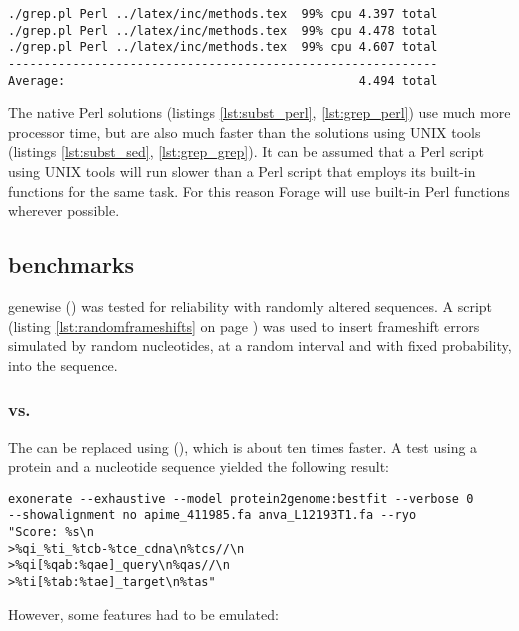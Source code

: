 \begin{verbatim}
./grep.pl Perl ../latex/inc/methods.tex  99% cpu 4.397 total
./grep.pl Perl ../latex/inc/methods.tex  99% cpu 4.478 total
./grep.pl Perl ../latex/inc/methods.tex  99% cpu 4.607 total
------------------------------------------------------------
Average:                                         4.494 total
\end{verbatim}

The native Perl solutions (listings \ref{lst:subst_perl}, \ref{lst:grep_perl}) use much more processor time, but are also much faster than the solutions using UNIX tools (listings \ref{lst:subst_sed}, \ref{lst:grep_grep}). It can be assumed that a Perl script using UNIX tools will run slower than a Perl script that employs its built-in functions for the same task. For this reason Forage will use built-in Perl functions wherever possible.

\subsection{ benchmarks}
genewise (\cite{Birney2004}) was tested for reliability with randomly altered sequences. A script (listing \ref{lst:randomframeshifts} on page \pageref{lst:randomframeshifts}) was used to insert frameshift errors simulated by random nucleotides, at a random interval and with fixed probability, into the sequence. 

\subsubsection{ vs. }
The  can be replaced using  (\cite{Slater2005}), which is about ten times faster. A test using a protein and a nucleotide sequence yielded the following result:
\begin{verbatim}
exonerate --exhaustive --model protein2genome:bestfit --verbose 0 
--showalignment no apime_411985.fa anva_L12193T1.fa --ryo 
"Score: %s\n
>%qi_%ti_%tcb-%tce_cdna\n%tcs//\n
>%qi[%qab:%qae]_query\n%qas//\n
>%ti[%tab:%tae]_target\n%tas" 
\end{verbatim}

However, some features had to be emulated: 
